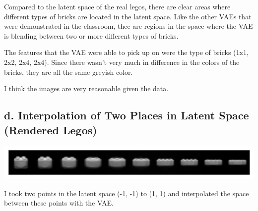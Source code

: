 \documentclass[]{article}
\begin{document}
Compared to the latent space of the real legos, there are clear
areas where different types of bricks are located in the latent space.
Like the other VAEs that were demonstrated in the classroom,
thee are regions in the space where the VAE is blending between two or
more different types of bricks.

The features that the VAE were able to pick up on were
the type of bricks (1x1, 2x2, 2x4, 2x4). Since there
wasn't very much in difference in the colors of the bricks,
they are all the same greyish color.

I think the images are very reasonable given the data.

\subsection*{d. Interpolation of Two Places in Latent Space (Rendered Legos)}
\begin{center}
  \includegraphics[scale=0.9]{interpolation-lego-blender-4}
\end{center}

I took two points in the latent space (-1, -1) to (1, 1) and interpolated
the space between these points with the VAE.
\newpage
\end{document}
